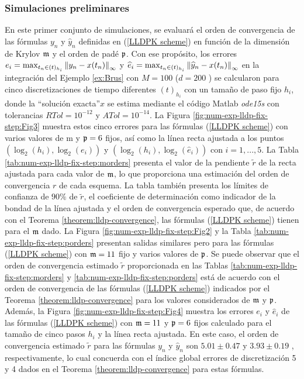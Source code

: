 \subsubsection{Simulaciones preliminares}
En este primer conjunto de simulaciones, se evaluará el orden de convergencia de las fórmulas $y_n$ y $\widehat{y}_n$ definidas en (\ref{LLDPK scheme}) en función de la dimensión de Krylov $\mathfrak{m}$ y el orden de padé $\mathfrak{p}$. Con ese propósito, los errores $e_i=\max_{t_n\in(t)_{h_i}}\left\lVert y_n-x(t_n) \right\rVert_\infty$ y $\widehat{e}_i=\max_{t_n\in(t )_{h_i}}\left\lVert \widehat{y}_n-x(t_n) \right\rVert_\infty$ en la integración del Ejemplo \ref{ex:Brus} con $M=100$ ($d=200$ ) se calcularon para cinco discretizaciones de tiempo diferentes $(t)_{h_i}$ con un tamaño de paso fijo $h_i$, donde la \textquotedblleft solución exacta\textquotedblright $x$ se estima mediante el código Matlab \textit{ode15s} con tolerancias $RTol=10^{ -12}$ y $ATol=10^{-14}$. La Figura \ref{fig:num-exp-lldp-fix-step:Fig3} muestra estos cinco errores para las fórmulas (\ref{LLDPK scheme}) con varios valores de m y $\mathfrak{p}=6$ fijos, así como la línea recta ajustada a los puntos $(\log_2( h_i),\log_2(e_i))$ y $(\log_2(h_i),\log_2(\widehat{e}_i))$ con $i=1,...,5$. La Tabla \ref{tab:num-exp-lldp-fix-step:morders} presenta el valor de la pendiente $\widetilde{r}$ de la recta ajustada para cada valor de $\mathfrak{m}$, lo que proporciona una estimación del orden de convergencia $r$ de cada esquema. La tabla también presenta los límites de confianza de $90\%$ de $\widetilde{r}$, el coeficiente de determinación como indicador de la bondad de la línea ajustada y el orden de convergencia esperado que, de acuerdo con el Teorema \ref{theorem:lldp-convergence}, las fórmulas (\ref{LLDPK scheme}) tienen para el $\mathfrak{m}$ dado. La Figura \ref{fig:num-exp-lldp-fix-step:Fig2} y la Tabla \ref{tab:num-exp-lldp-fix-step:porders} presentan salidas similares pero para las fórmulas (\ref{LLDPK scheme}) con $\mathfrak{m}=11$ fijo y varios valores de $\mathfrak{p}$. Se puede observar que el orden de convergencia estimado $\widetilde{r}$ proporcionada en las Tablas \ref{tab:num-exp-lldp-fix-step:morders} y \ref{tab:num-exp-lldp-fix-step:porders} está de acuerdo con el orden de convergencia de las fórmulas (\ref{LLDPK scheme}) indicados por el Teorema \ref{theorem:lldp-convergence} para los valores considerados de $\mathfrak{m}$ y $\mathfrak{p}$. Además, la Figura \ref{fig:num-exp-lldp-fix-step:Fig4} muestra los errores $e_i$ y $\widehat{e}_i$ de las fórmulas (\ref{LLDPK scheme}) con $\mathfrak{m}=11$ y $\mathfrak{p}=6$ fijos calculado para el tamaño de cinco pasos $h_i$ y la línea recta ajustada. En este caso, el orden de convergencia estimado $\widetilde{r}$ para las fórmulas $y_n$ y $\widehat{y}_n$ son $5.01 \pm 0.47$ y $3.93 \pm 0.19$ , respectivamente, lo cual concuerda con el índice global errores de discretización 5 y 4 dados en el Teorema \ref{theorem:lldp-convergence} para estas fórmulas.


